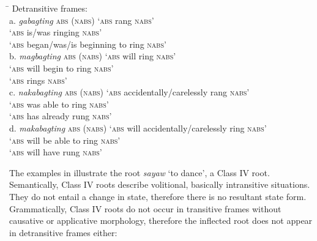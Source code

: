 \begin{tabbing}
\hspace{4.5cm} \= \kill
Detransitive frames: \\
a.  \textit{gabagting} \textsc{abs} (\textsc{nabs})  \>  ‘\textsc{abs} rang \textsc{nabs}’ \\
\>         ‘\textsc{abs} is/was ringing \textsc{nabs}’ \\
\>         ‘\textsc{abs} began/was/is beginning to ring \textsc{nabs}’ \\
b.  \textit{magbagting} \textsc{abs} (\textsc{nabs}) \> ‘\textsc{abs} will ring \textsc{nabs}’ \\
\>         ‘\textsc{abs} will begin to ring \textsc{nabs}’ \\
\>        ‘\textsc{abs} rings \textsc{nabs}’ \\
c.  \textit{nakabagting} \textsc{abs} (\textsc{nabs}) \> ‘\textsc{abs} accidentally/carelessly rang \textsc{nabs}’ \\
\>       ‘\textsc{abs} was able to ring \textsc{nabs}’ \\
\>        ‘\textsc{abs} has already rung \textsc{nabs}’ \\
d.  \textit{makabagting} \textsc{abs} (\textsc{nabs}) \> ‘\textsc{abs} will accidentally/carelessly ring \textsc{nabs}’ \\
\>       ‘\textsc{abs} will be able to ring \textsc{nabs}’ \\
\>        ‘\textsc{abs} will have rung \textsc{nabs}’
\end{tabbing}
\z

The examples in  illustrate the root \textit{sayaw} ‘to dance’, a Class IV root. Semantically, Class IV roots describe volitional, basically intransitive situations. They do not entail a change in state, therefore there is no resultant state form. Grammatically, Class IV roots do not occur in transitive frames without causative or applicative morphology, therefore the inflected root does not appear in detransitive frames either:

